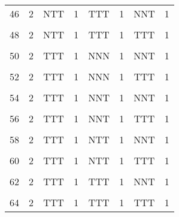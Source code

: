 \begin{table}[H]
{\begin{tabular}[t]{cccccccc}
			46 & 2 & NTT & 1 & TTT & 1 & NNT & 1\\
			\cellcolor{gray!6}{47} & \cellcolor{gray!6}{2} & \cellcolor{gray!6}{NTT} & \cellcolor{gray!6}{1} & \cellcolor{gray!6}{TTT} & \cellcolor{gray!6}{1} & \cellcolor{gray!6}{NTT} & \cellcolor{gray!6}{1}\\
			48 & 2 & NTT & 1 & TTT & 1 & TTT & 1\\
			\cellcolor{gray!6}{49} & \cellcolor{gray!6}{2} & \cellcolor{gray!6}{TTT} & \cellcolor{gray!6}{1} & \cellcolor{gray!6}{NNN} & \cellcolor{gray!6}{1} & \cellcolor{gray!6}{NNN} & \cellcolor{gray!6}{1}\\
			50 & 2 & TTT & 1 & NNN & 1 & NNT & 1\\
			\cellcolor{gray!6}{51} & \cellcolor{gray!6}{2} & \cellcolor{gray!6}{TTT} & \cellcolor{gray!6}{1} & \cellcolor{gray!6}{NNN} & \cellcolor{gray!6}{1} & \cellcolor{gray!6}{NTT} & \cellcolor{gray!6}{1}\\
			52 & 2 & TTT & 1 & NNN & 1 & TTT & 1\\
			\cellcolor{gray!6}{53} & \cellcolor{gray!6}{2} & \cellcolor{gray!6}{TTT} & \cellcolor{gray!6}{1} & \cellcolor{gray!6}{NNT} & \cellcolor{gray!6}{1} & \cellcolor{gray!6}{NNN} & \cellcolor{gray!6}{1}\\
			54 & 2 & TTT & 1 & NNT & 1 & NNT & 1\\
			\cellcolor{gray!6}{55} & \cellcolor{gray!6}{2} & \cellcolor{gray!6}{TTT} & \cellcolor{gray!6}{1} & \cellcolor{gray!6}{NNT} & \cellcolor{gray!6}{1} & \cellcolor{gray!6}{NTT} & \cellcolor{gray!6}{1}\\
			56 & 2 & TTT & 1 & NNT & 1 & TTT & 1\\
			\cellcolor{gray!6}{57} & \cellcolor{gray!6}{2} & \cellcolor{gray!6}{TTT} & \cellcolor{gray!6}{1} & \cellcolor{gray!6}{NTT} & \cellcolor{gray!6}{1} & \cellcolor{gray!6}{NNN} & \cellcolor{gray!6}{1}\\
			58 & 2 & TTT & 1 & NTT & 1 & NNT & 1\\
			\cellcolor{gray!6}{59} & \cellcolor{gray!6}{2} & \cellcolor{gray!6}{TTT} & \cellcolor{gray!6}{1} & \cellcolor{gray!6}{NTT} & \cellcolor{gray!6}{1} & \cellcolor{gray!6}{NTT} & \cellcolor{gray!6}{1}\\
			60 & 2 & TTT & 1 & NTT & 1 & TTT & 1\\
			\cellcolor{gray!6}{61} & \cellcolor{gray!6}{2} & \cellcolor{gray!6}{TTT} & \cellcolor{gray!6}{1} & \cellcolor{gray!6}{TTT} & \cellcolor{gray!6}{1} & \cellcolor{gray!6}{NNN} & \cellcolor{gray!6}{1}\\
			62 & 2 & TTT & 1 & TTT & 1 & NNT & 1\\
			\cellcolor{gray!6}{63} & \cellcolor{gray!6}{2} & \cellcolor{gray!6}{TTT} & \cellcolor{gray!6}{1} & \cellcolor{gray!6}{TTT} & \cellcolor{gray!6}{1} & \cellcolor{gray!6}{NTT} & \cellcolor{gray!6}{1}\\
			64 & 2 & TTT & 1 & TTT & 1 & TTT & 1\\
			\bottomrule
	\end{tabular}}
\end{table}

